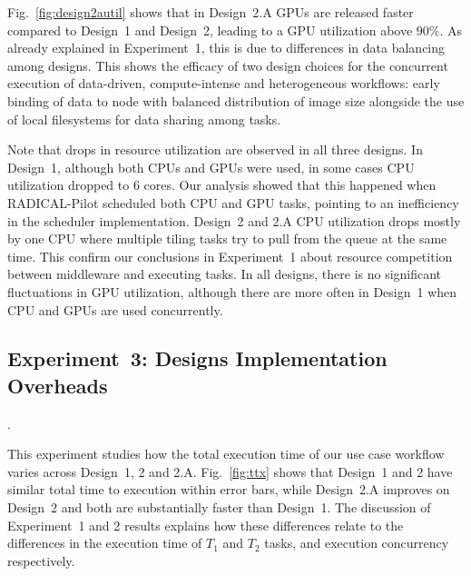 Fig.~\ref{fig:design2autil} shows that in Design~2.A GPUs are released faster compared to Design~1 and Design~2, leading to a GPU utilization above $90\%$.
As already explained in Experiment~1, this is due to differences in data balancing among designs.
This shows the efficacy of two design choices for the concurrent execution of data-driven, compute-intense and heterogeneous workflows: early binding of data to node with balanced distribution of image size alongside the use of local filesystems for data sharing among tasks.

Note that drops in resource utilization are observed in all three designs.
In Design~1, although both CPUs and GPUs were used, in some cases CPU utilization dropped to 6 cores.
Our analysis showed that this happened when RADICAL-Pilot scheduled both CPU and GPU tasks, pointing to an inefficiency in the scheduler implementation.
Design~2 and 2.A CPU utilization drops mostly by one CPU where multiple tiling tasks try to pull from the queue at the same time.
This confirm our conclusions in Experiment~1 about resource competition between middleware and executing tasks.
In all designs, there is no significant fluctuations in GPU utilization, although there are more often in Design~1 when CPU and GPUs are used concurrently.

\subsection{Experiment~3: Designs Implementation Overheads}\label{ssec:exp3}. 

This experiment studies how the total execution time of our use case workflow varies across Design~1, 2 and 2.A. Fig.~\ref{fig:ttx} shows that Design~1 and 2 have similar total time to execution within error bars, while Design~2.A improves on Design~2 and both are substantially faster than Design~1.
The discussion of Experiment~1 and 2 results explains how these differences relate to the differences in the execution time of $T_{1}$ and $T_{2}$ tasks, and execution concurrency respectively.

